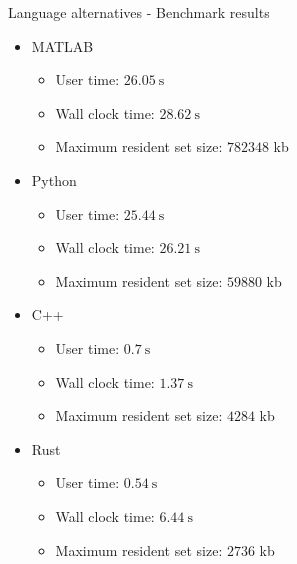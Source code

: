 \documentclass{beamer}
\begin{document}
\begin{frame}{Language alternatives - Benchmark results}

    \begin{itemize}
        \item MATLAB

        \begin{itemize}
            \item User time: $\SI{26.05}{\second}$
            \item Wall clock time: $\SI{28.62}{\second}$
            \item Maximum resident set size: $782348$ kb
        \end{itemize}

        \item Python

        \begin{itemize}
            \item User time: $\SI{25.44}{\second}$
            \item Wall clock time: $\SI{26.21}{\second}$
            \item Maximum resident set size: $59880$ kb
        \end{itemize}

        \item C++
        
        \begin{itemize}
            \item User time: $\SI{0.7}{\second}$
            \item Wall clock time: $\SI{1.37}{\second}$
            \item Maximum resident set size: $4284$ kb
        \end{itemize}

        \item Rust
        
        \begin{itemize}
            \item User time: $\SI{0.54}{\second}$
            \item Wall clock time: $\SI{6.44}{\second}$
            \item Maximum resident set size: $2736$ kb
        \end{itemize}
    \end{itemize}
    
\end{frame}
\end{document}
